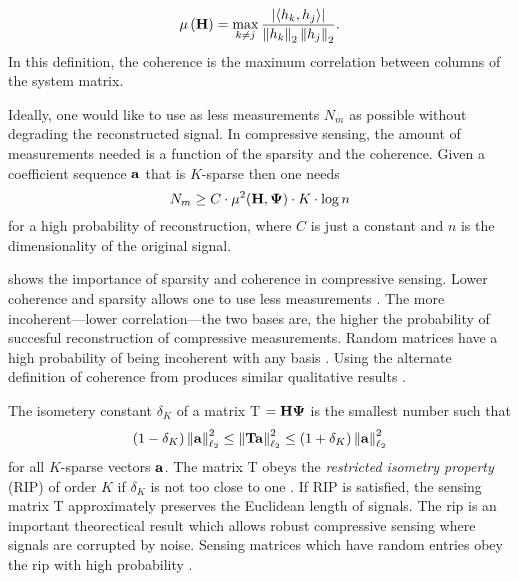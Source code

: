 \begin{equation}
	\mu \left( \mathbf{H} \right) =  \max_{k \neq j } \frac{ | \langle h_k, h_j \rangle | } { \left\| h_k \right\|_2 \left\| h_j \right\|_2 }.
	\label{eq:coherenceDef2}
\end{equation}
In this definition, the coherence is the maximum correlation between columns of the system matrix. 

Ideally, one would like to use as less measurements $N_m$ as possible without degrading the reconstructed signal. In \gls{compressive sensing}, the amount of measurements needed is a function of the sparsity and the coherence. Given a coefficient sequence $\mathbf{a}$ that is $K$-sparse then one needs
\begin{equation}
N_m \geq C \cdot \mu^2 ( \mathbf{H} , \mathbf{\Psi} ) \cdot K \cdot \log n
\label{eq:minMeas1}
\end{equation}
for a high probability of reconstruction, where $C$ is just a constant and $n$ is the dimensionality of the original signal.

 shows the importance of sparsity and coherence in compressive sensing. Lower coherence and sparsity allows one to use less measurements \cite{duarte2008single}. The more incoherent---lower correlation---the two bases are, the higher the probability of succesful reconstruction of compressive measurements. Random matrices have a high probability of being incoherent with any basis \cite{candes2008introduction}. Using the alternate definition of coherence from  produces similar qualitative results \cite{tropp2006just}. 

The isometery constant $\delta_K$ of a matrix \gls{T} $=\mathbf{H}\mathbf{\Psi}$ is the smallest number such that 
\begin{equation}
\left( 1 - \delta_K \right) \left\| \mathbf{a} \right\|_{\ell_2}^{2} \leq \left\| \mathbf{T} \mathbf{a} \right\|_{\ell_2}^{2} \leq \left( 1 + \delta_K \right) \left\| \mathbf{a} \right\|_{\ell_2}^{2} 
\end{equation}
for all $K$-sparse vectors $\mathbf{a}$. The matrix \gls{T} obeys the \emph{restricted isometry property} (RIP) of order $K$ if $\delta_K$ is not too close to one \cite{candes2008introduction}. If RIP is satisfied, the sensing matrix \gls{T} approximately preserves the Euclidean length of signals. The \gls{rip} is an important theorectical result which allows robust compressive sensing where signals are corrupted by noise. Sensing matrices which have random entries obey the \gls{rip} with high probability \cite{candes2008introduction, duarte2008single, foucart2013mathematical}. 

